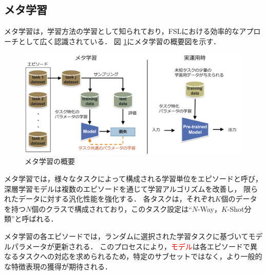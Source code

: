 \documentclass[a4paper,11pt,nomag]{jsreport}
\begin{document}
\subsection{メタ学習}

メタ学習は，学習方法の学習として知られており，FSLにおける効率的なアプローチとして広く認識されている．
図 \ref{fig:meta-learning}にメタ学習の概要図を示す．
% 
\begin{figure}[tbp]
  \centering
  \includegraphics[width=\linewidth, keepaspectratio]{image/meta-learning.png}
  \caption{メタ学習の概要}
  \label{fig:meta-learning}
\end{figure}
% 
メタ学習では，様々なタスクによって構成される学習単位をエピソードと呼び，深層学習モデルは複数のエピソードを通じて学習アルゴリズムを改善し，
限られたデータに対する汎化性能を強化する．
各タスクは，それぞれ$K$個のデータを持つ$N$個のクラスで構成されており，このタスク設定は``$N$-Way，$K$-Shot分類''と呼ばれる．

メタ学習の各エピソードでは，ランダムに選択された学習タスクに基づいてモデルパラメータが更新される．
このプロセスにより，\textcolor{red}{モデル}は各エピソードで異なるタスクへの対応を求められるため，特定のサブセットではなく，より一般的な特徴表現の獲得が期待される．
\end{document}
